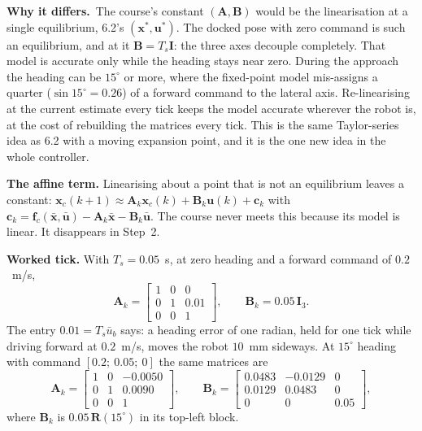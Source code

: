 \documentclass[11pt,a4paper]{article}
\newcommand{\vect}[1]{\bm{#1}}
\newcommand{\mat}[1]{\bm{#1}}
\newcommand{\Rot}{\mat{R}}
\newcommand{\Ts}{T_s}
\newcommand{\why}{\textbf{\textcolor{red!60!black}{Why it differs.}}\ }
\begin{document}
\why The course's constant $(\mat A, \mat B)$ would be the linearisation at a single equilibrium, 6.2's $(\vect x^*, \vect u^*)$. The docked pose with zero command is such an equilibrium, and at it $\mat B = \Ts\mat I$: the three axes decouple completely. That model is accurate only while the heading stays near zero. During the approach the heading can be $15^\circ$ or more, where the fixed-point model mis-assigns a quarter ($\sin 15^\circ = 0.26$) of a forward command to the lateral axis. Re-linearising at the current estimate every tick keeps the model accurate wherever the robot is, at the cost of rebuilding the matrices every tick. This is the same Taylor-series idea as 6.2 with a moving expansion point, and it is the one new idea in the whole controller.

\textbf{The affine term.} Linearising about a point that is not an equilibrium leaves a constant: $\vect x_c(k+1)\approx\mat A_k\vect x_c(k) + \mat B_k\vect u(k) + \vect c_k$ with $\vect c_k = \vect f_c(\bar{\vect x},\bar{\vect u}) - \mat A_k\bar{\vect x} - \mat B_k\bar{\vect u}$. The course never meets this because its model is linear. It disappears in Step~2.

\textbf{Worked tick.} With $\Ts = 0.05$~s, at zero heading and a forward command of $0.2$~m/s,
\begin{equation}
\mat A_k = \begin{bmatrix}1 & 0 & 0\\ 0 & 1 & 0.01\\ 0 & 0 & 1\end{bmatrix},\qquad
\mat B_k = 0.05\,\mat I_3 .
\end{equation}
The entry $0.01 = \Ts\bar u_b$ says: a heading error of one radian, held for one tick while driving forward at $0.2$~m/s, moves the robot $10$~mm sideways. At $15^\circ$ heading with command $[0.2;\ 0.05;\ 0]$ the same matrices are
\begin{equation}
\mat A_k = \begin{bmatrix}1 & 0 & -0.0050\\ 0 & 1 & 0.0090\\ 0 & 0 & 1\end{bmatrix},\qquad
\mat B_k = \begin{bmatrix}0.0483 & -0.0129 & 0\\ 0.0129 & 0.0483 & 0\\ 0 & 0 & 0.05\end{bmatrix},
\end{equation}
where $\mat B_k$ is $0.05\,\Rot(15^\circ)$ in its top-left block.
\end{document}
